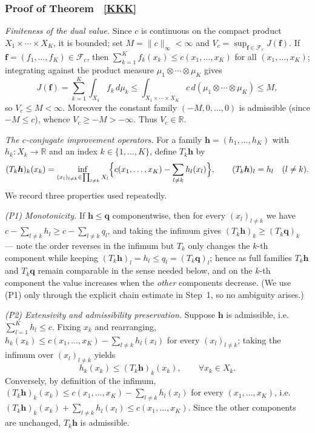 \documentclass[twoside,11pt,a4paper]{article}
\newcommand*{\SavedRef}{}
\let\SavedRef\ref
\renewcommand*{\ref}[1]{  \begingroup
    \hypersetup{
      linkcolor=linkequation,
      linkbordercolor=linkequation,
    }    \SavedRef{#1}  \endgroup
}
\begin{document}
\subsubsection*{Proof of Theorem~\ref{KKK}}

\noindent\emph{Finiteness of the dual value.}
Since $c$ is continuous on the compact product $X_1\times\cdots\times X_K$, it is
bounded; set $M=\|c\|_\infty<\infty$ and
$V_c=\sup_{\boldsymbol f\in\mathcal F_c}J(\boldsymbol f)$. If
$\boldsymbol f=(f_1,\dots,f_K)\in\mathcal F_c$, then
$\sum_{k=1}^K f_k(x_k)\le c(x_1,\dots,x_K)$ for all $(x_1,\dots,x_K)$; integrating
against the product measure $\mu_1\otimes\cdots\otimes\mu_K$ gives
\[
J(\boldsymbol f)=\sum_{k=1}^K\int_{X_k}f_k\,d\mu_k
\le\int_{X_1\times\cdots\times X_K}c\,d(\mu_1\otimes\cdots\otimes\mu_K)\le M,
\]
so $V_c\le M<\infty$. Moreover the constant family $(-M,0,\dots,0)$ is admissible
(since $-M\le c$), whence $V_c\ge -M>-\infty$. Thus $V_c\in\mathbb R$.

\medskip
\noindent\emph{The $c$-conjugate improvement operators.}
For a family $\boldsymbol h=(h_1,\dots,h_K)$ with $h_k:X_k\to\mathbb R$ and an index
$k\in\{1,\dots,K\}$, define $T_k\boldsymbol h$ by
\[
(T_k\boldsymbol h)_k(x_k)
=\inf_{(x_l)_{l\ne k}\in\prod_{l\ne k}X_l}
\Bigl\{c(x_1,\dots,x_K)-\sum_{l\ne k}h_l(x_l)\Bigr\},
\qquad
(T_k\boldsymbol h)_l=h_l\quad(l\ne k).
\]
We record three properties used repeatedly.

\emph{(P1) Monotonicity.} If $\boldsymbol h\le\boldsymbol q$ componentwise, then for
every $(x_l)_{l\ne k}$ we have
$c-\sum_{l\ne k}h_l\ge c-\sum_{l\ne k}q_l$, and taking the infimum gives
$(T_k\boldsymbol h)_k\ge(T_k\boldsymbol q)_k$ — note the order reverses in the
infimum but $T_k$ only changes the $k$-th component while keeping
$(T_k\boldsymbol h)_l=h_l\le q_l=(T_k\boldsymbol q)_l$; hence as full families
$T_k\boldsymbol h$ and $T_k\boldsymbol q$ remain comparable in the sense needed
below, and on the $k$-th component the value increases when the \emph{other}
components decrease. (We use (P1) only through the explicit chain estimate in
Step~1, so no ambiguity arises.)

\emph{(P2) Extensivity and admissibility preservation.} Suppose $\boldsymbol h$ is
admissible, i.e.\ $\sum_{l=1}^K h_l\le c$. Fixing $x_k$ and rearranging,
$h_k(x_k)\le c(x_1,\dots,x_K)-\sum_{l\ne k}h_l(x_l)$ for every $(x_l)_{l\ne k}$;
taking the infimum over $(x_l)_{l\ne k}$ yields
\[
h_k(x_k)\le (T_k\boldsymbol h)_k(x_k),\qquad\forall x_k\in X_k.
\]
Conversely, by definition of the infimum,
$(T_k\boldsymbol h)_k(x_k)\le c(x_1,\dots,x_K)-\sum_{l\ne k}h_l(x_l)$ for every
$(x_1,\dots,x_K)$, i.e.\
$(T_k\boldsymbol h)_k(x_k)+\sum_{l\ne k}h_l(x_l)\le c(x_1,\dots,x_K)$. Since the
other components are unchanged, $T_k\boldsymbol h$ is admissible.
\end{document}
